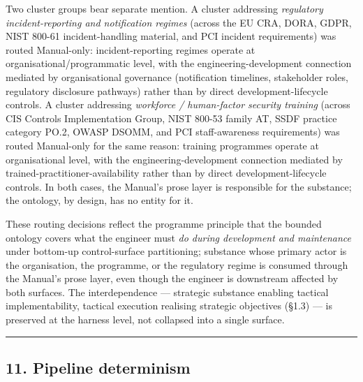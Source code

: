 \documentclass[
]{article}
\begin{document}
Two cluster groups bear separate mention. A cluster addressing
\emph{regulatory incident-reporting and notification regimes} (across
the EU CRA, DORA, GDPR, NIST 800-61 incident-handling material, and PCI
incident requirements) was routed Manual-only: incident-reporting
regimes operate at organisational/programmatic level, with the
engineering-development connection mediated by organisational governance
(notification timelines, stakeholder roles, regulatory disclosure
pathways) rather than by direct development-lifecycle controls. A
cluster addressing \emph{workforce / human-factor security training}
(across CIS Controls Implementation Group, NIST 800-53 family AT, SSDF
practice category PO.2, OWASP DSOMM, and PCI staff-awareness
requirements) was routed Manual-only for the same reason: training
programmes operate at organisational level, with the
engineering-development connection mediated by
trained-practitioner-availability rather than by direct
development-lifecycle controls. In both cases, the Manual's prose layer
is responsible for the substance; the ontology, by design, has no entity
for it.

These routing decisions reflect the programme principle that the bounded
ontology covers what the engineer must \emph{do during development and
maintenance} under bottom-up control-surface partitioning; substance
whose primary actor is the organisation, the programme, or the
regulatory regime is consumed through the Manual's prose layer, even
though the engineer is downstream affected by both surfaces. The
interdependence --- strategic substance enabling tactical
implementability, tactical execution realising strategic objectives
(§1.3) --- is preserved at the harness level, not collapsed into a
single surface.

\begin{center}\rule{0.5\linewidth}{0.5pt}\end{center}

\subsection{11. Pipeline determinism}\label{pipeline-determinism}
\end{document}
